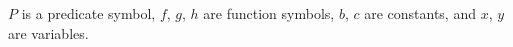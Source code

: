 $P$ is a predicate symbol, $f$, $g$, $h$ are function symbols, $b$, $c$ are constants, and $x$, $y$ are variables.
